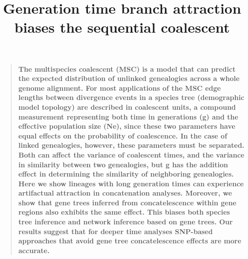 \documentclass[12pt]{article}
\title{Generation time branch attraction biases the sequential coalescent}
\author
{Patrick F. McKenzie,${^1}$, Sandra L. Hoffberg,${^1}, and Deren A. R. Eaton,$^{1\ast}$\\
\\
\normalsize{$^{1}$Department of Ecology, Evolution, and Environmental Biology, Columbia University,}\\
\normalsize{1200 Amsterdam Ave., New York, USA}\\
\\
\normalsize{$^\ast$To whom correspondence should be addressed; E-mail:  de2356@columbia.edu.}
}
\date{}
\newenvironment{sciabstract}{%
\begin{quote} \bf}
{\end{quote}}
\begin{document}
 


\baselineskip24pt


\maketitle 




\begin{sciabstract}
  The multispecies coalescent (MSC) is a model that can predict the 
  expected distribution of unlinked genealogies across a whole genome 
  alignment. For most applications of the MSC edge lengths between 
  divergence events in a species tree (demographic model topology)
  are described in coalescent units, a compound measurement representing 
  both time in generations (g) and the effective population size (Ne), 
  since these two parameters have equal effects on the probability of 
  coalescence. In the case of linked genealogies, however, these parameters
  must be separated. Both can affect the variance of coalescent times, 
  and the variance in similarity between two genealogies, but g has the 
  addition effect in determining the similarity of neighboring genealogies.
  Here we show lineages with long generation times can experience 
  artifactual attraction in concatenation analyses. Moreover, we show that
  gene trees inferred from concatelescence within gene regions also exhibits
  the same effect. This biases both species tree inference and network 
  inference based on gene trees. Our results suggest that for deeper time
  analyses SNP-based approaches that avoid gene tree concatelescence 
  effects are more accurate.

\end{sciabstract}

\end{document}
